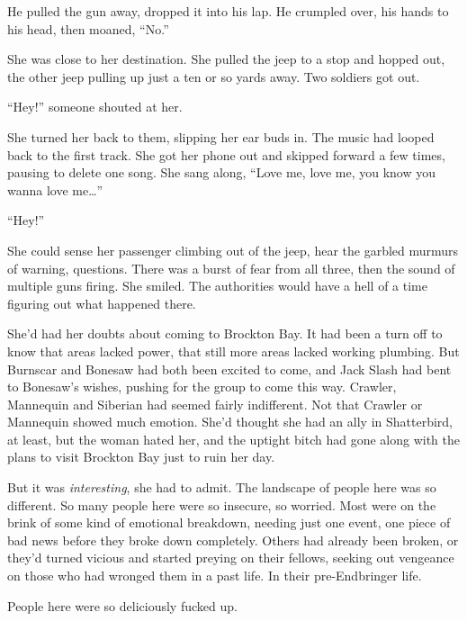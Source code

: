 He pulled the gun away, dropped it into his lap.  He crumpled over, his hands to his head, then moaned, ``No.''



She was close to her destination.  She pulled the jeep to a stop and hopped out, the other jeep pulling up just a ten or so yards away.  Two soldiers got out.



``Hey!'' someone shouted at her.



She turned her back to them, slipping her ear buds in.  The music had looped back to the first track.  She got her phone out and skipped forward a few times, pausing to delete one song.  She sang along, ``Love me, love me, you know you wanna love me\ldots''



``Hey!''



She could sense her passenger climbing out of the jeep, hear the garbled murmurs of warning, questions.  There was a burst of fear from all three, then the sound of multiple guns firing.  She smiled.  The authorities would have a hell of a time figuring out what happened there.



She'd had her doubts about coming to Brockton Bay.  It had been a turn off to know that areas lacked power, that still more areas lacked working plumbing.  But Burnscar and Bonesaw had both been excited to come, and Jack Slash had bent to Bonesaw's wishes, pushing for the group to come this way.  Crawler, Mannequin and Siberian had seemed fairly indifferent.  Not that Crawler or Mannequin showed much emotion.  She'd thought she had an ally in Shatterbird, at least, but the woman hated her, and the uptight bitch had gone along with the plans to visit Brockton Bay just to ruin her day.



But it was \emph{interesting}, she had to admit.  The landscape of people here was so different.  So many people here were so insecure, so worried.  Most were on the brink of some kind of emotional breakdown, needing just one event, one piece of bad news before they broke down completely.  Others had already been broken, or they'd turned vicious and started preying on their fellows, seeking out vengeance on those who had wronged them in a past life.  In their pre-Endbringer life.



People here were so deliciously fucked up.



